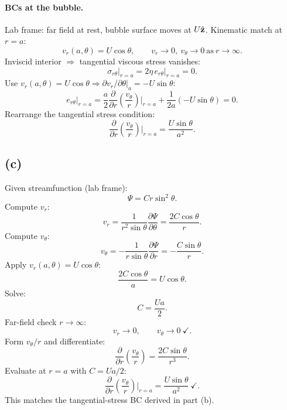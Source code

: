 \documentclass[11pt]{article}
\newcommand{\pd}[2]{\frac{\partial #1}{\partial #2}}
\begin{document}
\paragraph{BCs at the bubble.} Lab frame: far field at rest, bubble surface moves at $U\hat{\vb z}$. Kinematic match at $r=a$:
\[ v_r(a,\theta) = U\cos\theta,\qquad v_r\to 0,\ v_\theta\to 0\ \text{as}\ r\to\infty. \]
Inviscid interior $\Rightarrow$ tangential viscous stress vanishes:
\[ \sigma_{r\theta}\big|_{r=a} = 2\eta\,e_{r\theta}\big|_{r=a} = 0. \]
Use $v_r(a,\theta)=U\cos\theta\Rightarrow \partial v_r/\partial\theta|_{a}=-U\sin\theta$:
\[ e_{r\theta}\big|_{r=a} = \frac{a}{2}\pd{}{r}\!\left(\frac{v_\theta}{r}\right)\bigg|_{r=a} + \frac{1}{2a}(-U\sin\theta) = 0. \]
Rearrange the tangential stress condition:
\[ \boxed{\;\pd{}{r}\!\left(\frac{v_\theta}{r}\right)\bigg|_{r=a} = \frac{U\sin\theta}{a^2}.\;} \]

\subsection*{(c)}

Given streamfunction (lab frame):
\[ \Psi = C r\sin^2\theta. \]
Compute $v_r$:
\[ v_r = \frac{1}{r^2\sin\theta}\pd{\Psi}{\theta} = \frac{2C\cos\theta}{r}. \]
Compute $v_\theta$:
\[ v_\theta = -\frac{1}{r\sin\theta}\pd{\Psi}{r} = -\frac{C\sin\theta}{r}. \]
Apply $v_r(a,\theta)=U\cos\theta$:
\[ \frac{2C\cos\theta}{a} = U\cos\theta. \]
Solve:
\[ C = \frac{Ua}{2}. \]
Far-field check $r\to\infty$:
\[ v_r \to 0,\qquad v_\theta\to 0\ \checkmark. \]
Form $v_\theta/r$ and differentiate:
\[ \pd{}{r}\!\left(\frac{v_\theta}{r}\right) = \frac{2C\sin\theta}{r^3}. \]
Evaluate at $r=a$ with $C=Ua/2$:
\[ \pd{}{r}\!\left(\frac{v_\theta}{r}\right)\bigg|_{r=a} = \frac{U\sin\theta}{a^2}\ \checkmark. \]
This matches the tangential-stress BC derived in part (b).
\end{document}
